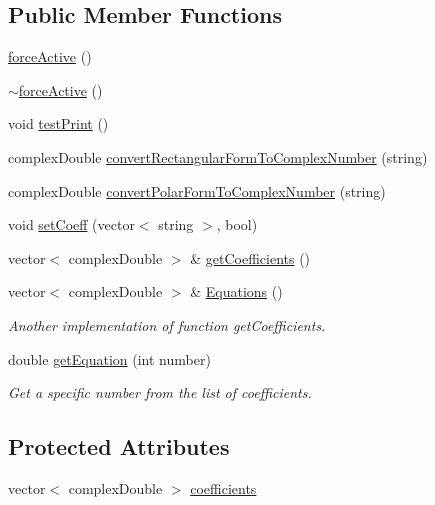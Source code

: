 \subsection*{Public Member Functions}
\begin{DoxyCompactItemize}
\item 
\hyperlink{classforce_active_a2458317c188c1ea0694aff5f721061bc}{force\-Active} ()
\item 
\hyperlink{classforce_active_ac9e52276505c97ce5ff607da247a7f14}{$\sim$force\-Active} ()
\item 
void \hyperlink{classforce_active_a80fbd7295a4d2b32bb8ab3950a872eca}{test\-Print} ()
\item 
complex\-Double \hyperlink{classforce_active_af09ddfe88141c00bd8fab17593563374}{convert\-Rectangular\-Form\-To\-Complex\-Number} (string)
\item 
complex\-Double \hyperlink{classforce_active_a03fb66815043f4c5e6d08773ffb46332}{convert\-Polar\-Form\-To\-Complex\-Number} (string)
\item 
void \hyperlink{classforce_active_afcff9aa12a46f3581d989c625a602da0}{set\-Coeff} (vector$<$ string $>$, bool)
\item 
vector$<$ complex\-Double $>$ \& \hyperlink{classforce_active_a041314936642219c8487b7dca8390a76}{get\-Coefficients} ()
\item 
vector$<$ complex\-Double $>$ \& \hyperlink{classforce_active_a168b10dc8406df80697c6953d85ab32c}{Equations} ()
\begin{DoxyCompactList}\small\item\em Another implementation of function get\-Coefficients. \end{DoxyCompactList}\item 
double \hyperlink{classforce_active_a73e2ff2076b1744fad52a409335187bf}{get\-Equation} (int number)
\begin{DoxyCompactList}\small\item\em Get a specific number from the list of coefficients. \end{DoxyCompactList}\end{DoxyCompactItemize}
\subsection*{Protected Attributes}
\begin{DoxyCompactItemize}
\item 
vector$<$ complex\-Double $>$ \hyperlink{classforce_active_a3fe0e79a07d544a436359694d3589d4e}{coefficients}
\end{DoxyCompactItemize}



